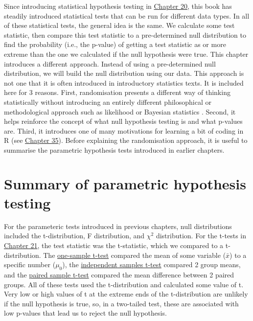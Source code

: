 \documentclass[
]{scrbook}
\begin{document}
Since introducing statistical hypothesis testing in \protect\hyperlink{Chapter_20}{Chapter 20}, this book has steadily introduced statistical tests that can be run for different data types.
In all of these statistical tests, the general idea is the same.
We calculate some test statistic, then compare this test statistic to a pre-determined null distribution to find the probability (i.e., the p-value) of getting a test statistic as or more extreme than the one we calculated if the null hypothesis were true.
This chapter introduces a different approach.
Instead of using a pre-determined null distribution, we will build the null distribution using our data.
This approach is not one that it is often introduced in introductory statistics texts.
It is included here for 3 reasons.
First, randomisation presents a different way of thinking statistically without introducing an entirely different philosophical or methodological approach such as likelihood \citep{Edwards1972} or Bayesian statistics \citep{Lee1997}.
Second, it helps reinforce the concept of what null hypothesis testing is and what p-values are.
Third, it introduces one of many motivations for learning a bit of coding in R (see \protect\hyperlink{Chapter_35}{Chapter 35}).
Before explaining the randomisation approach, it is useful to summarise the parametric hypothesis tests introduced in earlier chapters.

\hypertarget{summary-of-parametric-hypothesis-testing}{%
\section{Summary of parametric hypothesis testing}\label{summary-of-parametric-hypothesis-testing}}

For the parameteric tests introduced in previous chapters, null distributions included the t-distribution, F distribution, and \(\chi^{2}\) distribution.
For the t-tests in \protect\hyperlink{Chapter_21}{Chapter 21}, the test statistic was the t-statistic, which we compared to a t-distribution.
The \protect\hyperlink{one-sample-t-test}{one-sample t-test} compared the mean of some variable (\(\bar{x}\)) to a specific number (\(\mu_{0}\)), the \protect\hyperlink{independent-samples-t-test}{independent samples t-test} compared 2 group means, and the \protect\hyperlink{paired-sample-t-test}{paired sample t-test} compared the mean difference between 2 paired groups.
All of these tests used the t-distribution and calculated some value of t.
Very low or high values of t at the extreme ends of the t-distribution are unlikely if the null hypothesis is true, so, in a two-tailed test, these are associated with low p-values that lead us to reject the null hypothesis.
\end{document}
